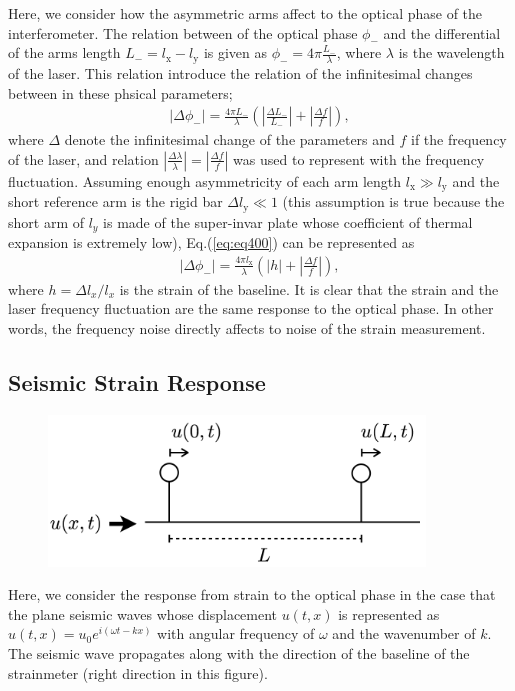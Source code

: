 Here, we consider how the asymmetric arms affect to the optical phase of the interferometer. The relation between of the optical phase $\phi_{-}$ and the differential of the arms length ${L_{-}}=l_{\mathrm{x}}-l_{\mathrm{y}}$ is given as ${\phi}_{-} = 4\pi\frac{{L_{-}}}{\lambda}$, where $\lambda$ is the wavelength of the laser. This relation introduce the relation of the infinitesimal changes between in these phsical parameters;
\begin{eqnarray}  
  \left|\Delta \phi_{-}\right| = \frac{4\pi{L_{-}}}{\lambda}\left( \left|\frac{\Delta L_{-}}{L_{-}}\right| + \left|\frac{\Delta f}{f}\right|\right), \label{eq:eq400}
\end{eqnarray}
where $\Delta$ denote the infinitesimal change of the parameters and $f$ if the frequency of the laser, and relation $|\frac{\Delta{\lambda}}{\lambda}| = |\frac{\Delta{f}}{f}|$ was used to represent with the frequency fluctuation. Assuming enough asymmetricity of each arm length $l_{\mathrm{x}} \gg l_{\mathrm{y}}$ and the short reference arm is the rigid bar $\Delta l_{\mathrm{y}} \ll 1$ (this assumption is true because the short arm of $l_y$ is made of the super-invar plate whose coefficient of thermal expansion is extremely low), Eq.(\ref{eq:eq400}) can be represented as
\begin{eqnarray}  
  \left|\Delta \phi_{-}\right| = \frac{4\pi{l_{\mathrm{x}}}}{\lambda}\left( \left|h\right|  + \left|\frac{\Delta f}{f}\right|\right), \label{eq:eq400_a}
\end{eqnarray}
where $h = \Delta{l_{x}}/l_x$ is the strain of the baseline. It is clear that the strain and the laser frequency fluctuation are the same response to the optical phase. In other words, the frequency noise directly affects to noise of the strain measurement.

\newpage
\subsection{Seismic Strain Response}
\begin{figure}[h]
  \centering
  \includegraphics[width=10cm]{./img_chap4/img430.png}
  \caption{} \label{img:img430}
\end{figure}
Here, we consider the response from strain to the optical phase in the case that the plane seismic waves whose displacement $u(t,x)$ is represented as $u(t,x)=u_0e^{i(\omega{t}-kx)}$ with angular frequency of $\omega$ and the wavenumber of $k$. The seismic wave propagates along with the direction of the baseline of the strainmeter (right direction in this figure).

